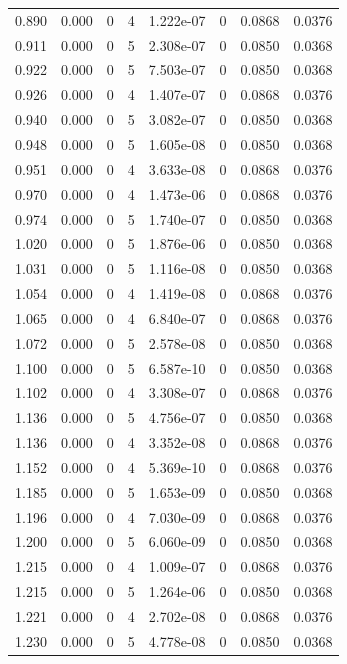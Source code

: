 \documentclass[preview]{standalone}
\begin{document}
{{{\begin{tabular}{L{1.2cm}C{1.2cm} C{0.3cm}C{0.5cm} C{1.4cm}C{1.4cm} C{1.4cm}C{1.4cm}}
  0.890  &  0.000  & 0     &  4 &  1.222e-07  & 0  & 0.0868 &  0.0376   \\ 
  0.911  &  0.000  & 0     &  5 &  2.308e-07  & 0  & 0.0850 &  0.0368   \\ 
  0.922  &  0.000  & 0     &  5 &  7.503e-07  & 0  & 0.0850 &  0.0368   \\ 
  0.926  &  0.000  & 0     &  4 &  1.407e-07  & 0  & 0.0868 &  0.0376   \\ 
  0.940  &  0.000  & 0     &  5 &  3.082e-07  & 0  & 0.0850 &  0.0368   \\ 
  0.948  &  0.000  & 0     &  5 &  1.605e-08  & 0  & 0.0850 &  0.0368   \\ 
  0.951  &  0.000  & 0     &  4 &  3.633e-08  & 0  & 0.0868 &  0.0376   \\ 
  0.970  &  0.000  & 0     &  4 &  1.473e-06  & 0  & 0.0868 &  0.0376   \\ 
  0.974  &  0.000  & 0     &  5 &  1.740e-07  & 0  & 0.0850 &  0.0368   \\ 
  1.020  &  0.000  & 0     &  5 &  1.876e-06  & 0  & 0.0850 &  0.0368   \\ 
  1.031  &  0.000  & 0     &  5 &  1.116e-08  & 0  & 0.0850 &  0.0368   \\ 
  1.054  &  0.000  & 0     &  4 &  1.419e-08  & 0  & 0.0868 &  0.0376   \\ 
  1.065  &  0.000  & 0     &  4 &  6.840e-07  & 0  & 0.0868 &  0.0376   \\ 
  1.072  &  0.000  & 0     &  5 &  2.578e-08  & 0  & 0.0850 &  0.0368   \\ 
  1.100  &  0.000  & 0     &  5 &  6.587e-10  & 0  & 0.0850 &  0.0368   \\ 
  1.102  &  0.000  & 0     &  4 &  3.308e-07  & 0  & 0.0868 &  0.0376   \\ 
  1.136  &  0.000  & 0     &  5 &  4.756e-07  & 0  & 0.0850 &  0.0368   \\ 
  1.136  &  0.000  & 0     &  4 &  3.352e-08  & 0  & 0.0868 &  0.0376   \\ 
  1.152  &  0.000  & 0     &  4 &  5.369e-10  & 0  & 0.0868 &  0.0376   \\ 
  1.185  &  0.000  & 0     &  5 &  1.653e-09  & 0  & 0.0850 &  0.0368   \\ 
  1.196  &  0.000  & 0     &  4 &  7.030e-09  & 0  & 0.0868 &  0.0376   \\ 
  1.200  &  0.000  & 0     &  5 &  6.060e-09  & 0  & 0.0850 &  0.0368   \\ 
  1.215  &  0.000  & 0     &  4 &  1.009e-07  & 0  & 0.0868 &  0.0376   \\ 
  1.215  &  0.000  & 0     &  5 &  1.264e-06  & 0  & 0.0850 &  0.0368   \\ 
  1.221  &  0.000  & 0     &  4 &  2.702e-08  & 0  & 0.0868 &  0.0376   \\ 
  1.230  &  0.000  & 0     &  5 &  4.778e-08  & 0  & 0.0850 &  0.0368   \\ 
\hline 
\end{tabular} 

}}}
\end{document}
